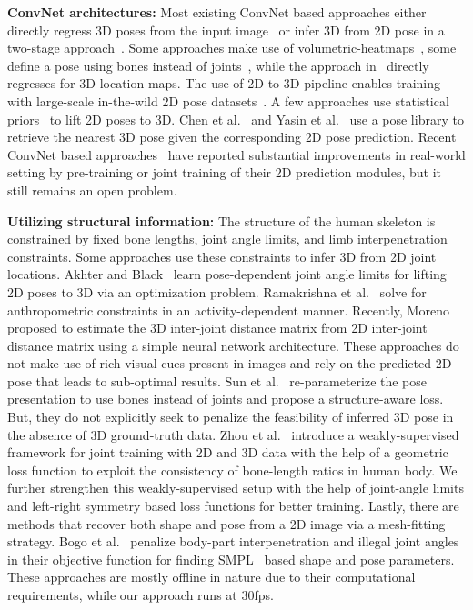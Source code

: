 \documentclass[runningheads]{llncs}
\begin{document}
\textbf{ConvNet architectures:} Most existing ConvNet based approaches either directly regress 3D poses from the input image~\cite{Sun_2017_ICCV,li20143d,zhou2016deep,zhou2016sparseness} or infer 3D from 2D pose in a two-stage approach~\cite{Tome_2017_CVPR,Zhou_2017_ICCV,VNect_SIGGRAPH2017,Moreno-Noguer_2017_CVPR,Lin_2017_CVPR}. Some approaches make use of volumetric-heatmaps~\cite{Pavlakos_2017_CVPR}, some define a pose using bones instead of joints~\cite{Sun_2017_ICCV}, while the approach in~\cite{VNect_SIGGRAPH2017} directly regresses for 3D location maps. The use of 2D-to-3D pipeline enables training with large-scale in-the-wild 2D pose datasets~\cite{andriluka14cvpr,MSCOCO:2014}. A few approaches use statistical priors~\cite{zhou2016sparseness,akhter2015pose} to lift 2D poses to 3D. Chen et al.~\cite{Chen_2017_CVPR} and Yasin et al.~\cite{yasin2016dual} use a pose library to retrieve the nearest 3D pose given the corresponding 2D pose prediction. Recent ConvNet based approaches~\cite{VNect_SIGGRAPH2017,Rogez_2017_CVPR,Zhou_2017_ICCV,Sun_2017_ICCV,zhou2016sparseness,Pavlakos_2017_CVPR} have reported substantial improvements in real-world setting by pre-training or joint training of their 2D prediction modules, but it still remains an open problem.

\textbf{Utilizing structural information:} The structure of the human skeleton is constrained by fixed bone lengths, joint angle limits, and limb interpenetration constraints. Some approaches use these constraints to infer 3D from 2D joint locations. Akhter and Black~\cite{akhter2015pose} learn pose-dependent joint angle limits for lifting 2D poses to 3D via an optimization problem. Ramakrishna et al.~\cite{varunECCV2012} solve for anthropometric constraints in an activity-dependent manner. Recently, Moreno~\cite{Moreno-Noguer_2017_CVPR} proposed to estimate the 3D inter-joint distance matrix from 2D inter-joint distance matrix using a simple neural network architecture. These approaches do not make use of rich visual cues present in images and rely on the predicted 2D pose that leads to sub-optimal results. Sun et al.~\cite{Sun_2017_ICCV} re-parameterize the pose presentation to use bones instead of joints and propose a structure-aware loss. But, they do not explicitly seek to penalize the feasibility of inferred 3D pose in the absence of 3D ground-truth data. Zhou et al.~\cite{Zhou_2017_ICCV} introduce a weakly-supervised framework for joint training with 2D and 3D data with the help of a geometric loss function to exploit the consistency of bone-length ratios in human body. We further strengthen this weakly-supervised setup with the help of joint-angle limits and left-right symmetry based loss functions for better training. Lastly, there are methods that recover both shape and pose from a 2D image via a mesh-fitting strategy. Bogo et al.~\cite{bogo2016keep} penalize body-part interpenetration and illegal joint angles in their objective function for finding SMPL~\cite{DBLP:journals/tog/LoperM0PB15} based shape and pose parameters. These approaches are mostly offline in nature due to their computational requirements, while our approach runs at 30fps.
\end{document}
